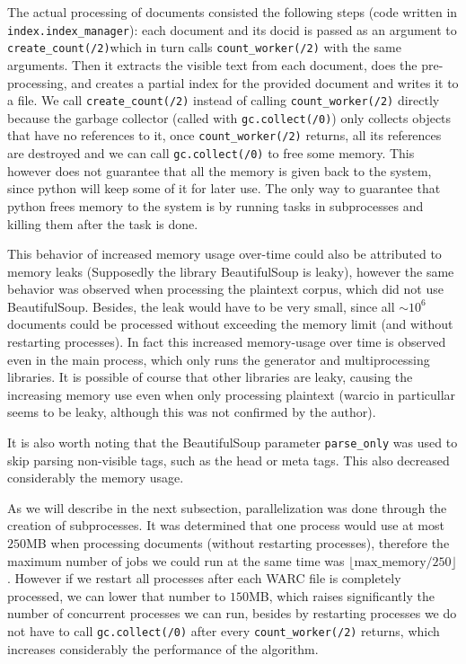 \documentclass[sigconf,authorversion,nonacm]{acmart}
\def\code#1{\texttt{#1}}
\begin{document}
The actual processing of documents consisted the following steps (code written in \code{index.index\_manager}): each document and its docid is passed as an argument to \code{create\_count(/2)}which in turn calls \code{count\_worker(/2)} with the same arguments. Then it extracts the visible text from each document, does the pre-processing, and creates a partial index for the provided document and writes it to a file. We call \code{create\_count(/2)} instead of calling \code{count\_worker(/2)} directly because the garbage collector (called with \code{gc.collect(/0)}) only collects objects that have no references to it, once \code{count\_worker(/2)} returns, all its references are destroyed and we can call \code{gc.collect(/0)} to free some memory. This however does not guarantee that all the memory is given back to the system, since python will keep some of it for later use. The only way to guarantee that python frees memory to the system is by running tasks in subprocesses and killing them after the task is done.

This behavior of increased memory usage over-time could also be attributed to memory leaks (Supposedly the library BeautifulSoup is leaky), however the same behavior was observed when processing the plaintext corpus, which did not use BeautifulSoup. Besides, the leak would have to be very small, since all $\sim 10^6$ documents could be processed without exceeding the memory limit (and without restarting processes). In fact this increased memory-usage over time is observed even in the main process, which only runs the generator and multiprocessing libraries. It is possible of course that other libraries are leaky, causing the increasing memory use even when only processing plaintext (warcio in particullar seems to be leaky, although this was not confirmed by the author).

It is also worth noting that the BeautifulSoup parameter \code{parse\_only} was used to skip parsing non-visible tags, such as the head or meta tags. This also decreased considerably the memory usage.

As we will describe in the next subsection, parallelization was done through the creation of subprocesses. It was determined that one process would use at most $250$MB when processing documents (without restarting processes), therefore the maximum number of jobs we could run at the same time was $\lfloor\text{max\_memory}/250\rfloor$. However if we restart all processes after each WARC file is completely processed, we can lower that number to $150$MB, which raises significantly the number of concurrent processes we can run, besides by restarting processes we do not have to call \code{gc.collect(/0)} after every \code{count\_worker(/2)} returns, which increases considerably the performance of the algorithm.
\end{document}
